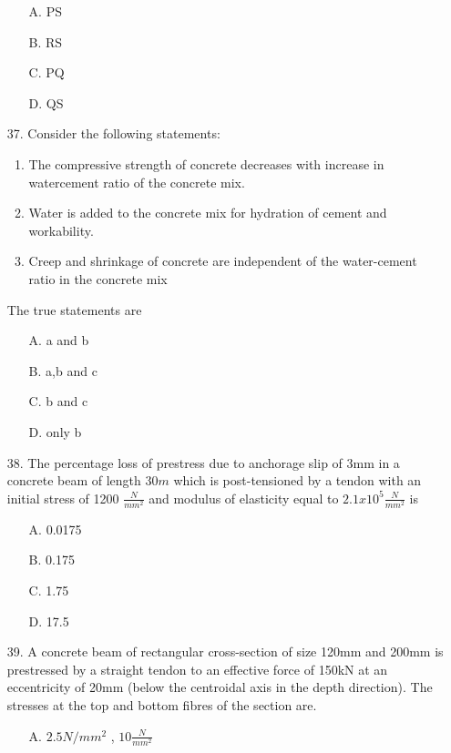 \documentclass[journal]{IEEEtran}
\begin{document}
\begin{enumerate}
\begin{figure}[h!]
\end{figure}
    \begin{enumerate}
        \item [A.] PS
        \item [B.] RS
        \item [C.] PQ
        \item [D.] QS
    \end{enumerate}
  \item[37.]  Consider the following statements: 
  \begin{enumerate}
    \item The compressive strength of concrete decreases with increase in watercement ratio of the concrete mix.
    \item Water is added to the concrete mix for hydration of cement and
    workability. 
    \item Creep and shrinkage of concrete are independent of the water-cement ratio
    in the concrete mix
  \end{enumerate}
  The true statements are 
  \begin{enumerate}
    \item [A.] a and b
    \item [B.] a,b and c
    \item [C.] b and c
    \item [D.] only b
  \end{enumerate}
  \item [38.] The percentage loss of prestress due to anchorage slip of 3mm in a concrete beam
  of length $30m$ which is post-tensioned by a tendon with an initial stress of 1200 $\frac{N}{mm^2}$
  and modulus of elasticity equal to $2.1 x 10^5\frac{N}{mm^2}$ is
  \begin{enumerate}
    \item [A.] 0.0175 
    \item [B.] 0.175 
    \item [C.] 1.75 
    \item [D.] 17.5 
  \end{enumerate}
  \item [39.] A concrete beam of rectangular cross-section of size 120mm  and 200mm
   is prestressed by a straight tendon to an effective force of 150kN at an
  eccentricity of 20mm (below the centroidal axis in the depth direction). The
  stresses at the top and bottom fibres of the section are.
  \begin{enumerate}
    \item [A.] $2.5N/mm^2$ , $10\frac{N}{mm^2}$ 

\end{enumerate}
\end{enumerate}
\end{document}
